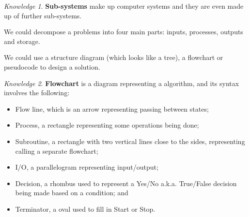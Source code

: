 \documentclass[8pt]{article}
\theoremstyle{remark}
\newtheorem{knowledge}{Knowledge}[subsection]
\begin{document}
        \begin{knowledge}
            \textbf{Sub-systems} make up computer systems and they are even made up of further sub-systems.

            We could decompose a problems into four main parts: inputs, processes, outputs and storage.

            We could use a structure diagram (which looks like a tree), a flowchart or pseudocode to design a solution.
        \end{knowledge}

        \begin{knowledge}
            \textbf{Flowchart} is a diagram representing a algorithm, and its syntax involves the following:
            \begin{itemize}
                \item Flow line, which is an arrow representing passing between states;
                \item Process, a rectangle representing some operations being done;
                \item Subroutine, a rectangle with two vertical lines close to the sides, representing calling a separate flowchart;
                \item I/O, a parallelogram representing input/output;
                \item Decision, a rhombus used to represent a Yes/No a.k.a. True/False decision being made based on a condition; and
                \item Terminator, a oval used to fill in Start or Stop.
            \end{itemize}
        \end{knowledge}
\end{document}
